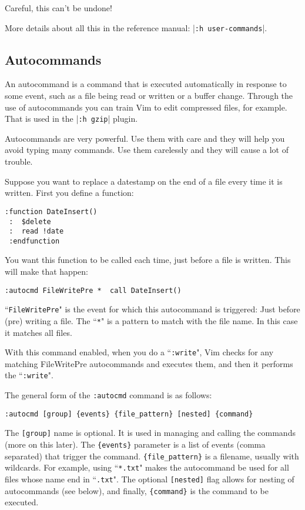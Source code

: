 Careful, this can't be undone!

More details about all this in the reference manual: |\texttt{:h user-commands}|.
\subsection{Autocommands}
\label{Autocommands}
An autocommand is a command that is executed automatically in response to some event, such as a file being read or written or a buffer change.
Through the use of autocommands you can train Vim to edit compressed files, for example.
That is used in the |\texttt{:h gzip}| plugin.

Autocommands are very powerful.
Use them with care and they will help you avoid typing many commands.
Use them carelessly and they will cause a lot of trouble.

Suppose you want to replace a datestamp on the end of a file every time it is written.
First you define a function:

\begin{Verbatim}[samepage=true]
 :function DateInsert()
 :  $delete
 :  read !date
 :endfunction
\end{Verbatim}

You want this function to be called each time, just before a file is written.
This will make that happen:

\begin{Verbatim}[samepage=true]
 :autocmd FileWritePre *  call DateInsert()
\end{Verbatim}

``\texttt{FileWritePre}" is the event for which this autocommand is triggered: Just before (pre) writing a file.
The ``\texttt{*}" is a pattern to match with the file name.
In this case it matches all files.

With this command enabled, when you do a ``\texttt{:write}", Vim checks for any matching FileWritePre autocommands and executes them, and then it performs the ``\texttt{:write}".

The general form of the \texttt{:autocmd} command is as follows:

\begin{Verbatim}[samepage=true]
 :autocmd [group] {events} {file_pattern} [nested] {command}
\end{Verbatim}

The \texttt{[group]} name is optional.
It is used in managing and calling the commands (more on this later).
The \texttt{\{events\}} parameter is a list of events (comma separated) that trigger the command.
\texttt{\{file\_pattern\}} is a filename, usually with wildcards.
For example, using ``\texttt{*.txt}" makes the autocommand be used for all files whose name end in ``\texttt{.txt}".
The optional \texttt{[nested]} flag allows for nesting of autocommands (see below), and finally, \texttt{\{command\}} is the command to be executed.

